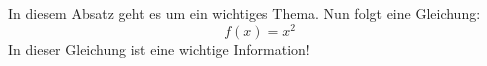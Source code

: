 In diesem Absatz geht es 
um ein wichtiges Thema.
Nun folgt eine Gleichung:
\[f(x)=x^2\]
In dieser Gleichung ist
eine wichtige Information!

